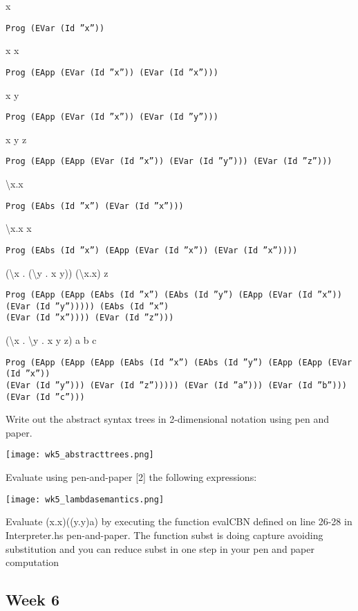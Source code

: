 \documentclass{article}
\theoremstyle{theorem}
\theoremstyle{definition}
\theoremstyle{remark}
\begin{document}
\parindent x
\begin{verbatim}
Prog (EVar (Id ”x”))
\end{verbatim}
x x
\begin{verbatim}
Prog (EApp (EVar (Id ”x”)) (EVar (Id ”x”)))
\end{verbatim}
x y
\begin{verbatim}
Prog (EApp (EVar (Id ”x”)) (EVar (Id ”y”)))
\end{verbatim}
x y z
\begin{verbatim}
Prog (EApp (EApp (EVar (Id ”x”)) (EVar (Id ”y”))) (EVar (Id ”z”)))
\end{verbatim}
\textbackslash x.x
\begin{verbatim}
Prog (EAbs (Id ”x”) (EVar (Id ”x”)))
\end{verbatim}
\textbackslash x.x x
\begin{verbatim}
Prog (EAbs (Id ”x”) (EApp (EVar (Id ”x”)) (EVar (Id ”x”))))
\end{verbatim}
(\textbackslash x . (\textbackslash y . x y)) (\textbackslash x.x) z
\begin{verbatim}
Prog (EApp (EApp (EAbs (Id ”x”) (EAbs (Id ”y”) (EApp (EVar (Id ”x”)) (EVar (Id ”y”))))) (EAbs (Id ”x”) 
(EVar (Id ”x”)))) (EVar (Id ”z”)))
\end{verbatim}
(\textbackslash x . \textbackslash y . x y z) a b c
\begin{verbatim}
Prog (EApp (EApp (EApp (EAbs (Id ”x”) (EAbs (Id ”y”) (EApp (EApp (EVar (Id ”x”)) 
(EVar (Id ”y”))) (EVar (Id ”z”))))) (EVar (Id ”a”))) (EVar (Id ”b”))) (EVar (Id ”c”)))
\end{verbatim}

Write out the abstract syntax trees in 2-dimensional notation using pen and paper.

\texttt{[image: wk5\_abstracttrees.png]}

Evaluate using pen-and-paper [2] the following expressions:

\texttt{[image: wk5\_lambdasemantics.png]}

Evaluate (x.x)((y.y)a) by executing the function evalCBN defined on line 26-28 in Interpreter.hs pen-and-paper. The function subst is doing capture avoiding substitution and you can reduce subst in one step in your pen and paper computation



\subsection{Week 6 }
\end{document}
